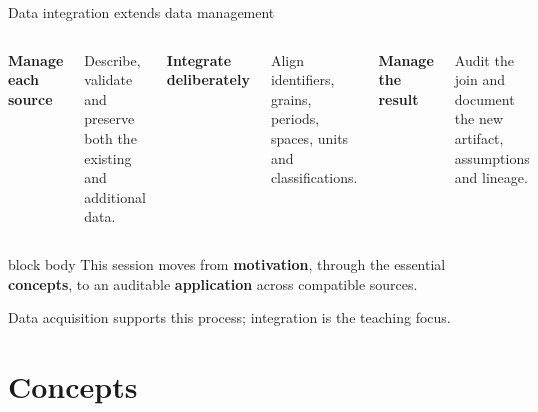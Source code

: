 \documentclass[10pt,aspectratio=169]{beamer}
\begin{document}
\begin{frame}{Data integration extends data management}

\small

\begin{columns}[T]


\textbf{Manage each source}

Describe, validate and preserve both the existing and additional data.


\textbf{Integrate deliberately}

Align identifiers, grains, periods, spaces, units and classifications.


\textbf{Manage the result}

Audit the join and document the new artifact, assumptions and lineage.

\end{columns}

\vspace{0.55cm}

\begin{beamercolorbox}[rounded=true,sep=8pt]{block body}
This session moves from \textbf{motivation}, through the essential
\textbf{concepts}, to an auditable \textbf{application} across compatible sources.
\end{beamercolorbox}

\vspace{0.25cm}

\centering
\textcolor{ukudlaRed}{Data acquisition supports this process; integration is the teaching focus.}

\end{frame}



\section{Concepts}
\end{document}
